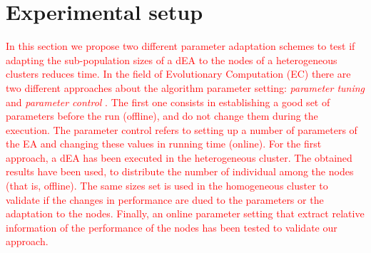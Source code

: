\documentclass[final,1p,times]{elsarticle}
\begin{document}


\section{Experimental setup}
\label{sec:experiments}
\textcolor{red}{In this section we propose two different parameter adaptation schemes to test if adapting the sub-population sizes of a dEA to the nodes of a  heterogeneous clusters reduces time. In the field of  Evolutionary Computation (EC) there are two different approaches about the algorithm parameter setting: {\em parameter tuning} and {\em parameter control} \cite{PARAMETERTUNING}. The first one consists in establishing a good set of parameters before the run (offline), and do not change them during the execution. The parameter control refers to setting up a number of parameters of the EA  and changing these values in running time (online). For the first approach, a dEA has been executed in the heterogeneous cluster. The obtained results have been used, to distribute the number of individual among the nodes (that is, offline). The same sizes set is used in the homogeneous cluster to validate if the changes in performance are dued to the parameters or the adaptation to the nodes. Finally, an online parameter setting that extract relative information of the performance of the nodes has been tested to validate our approach.}
\end{document}
